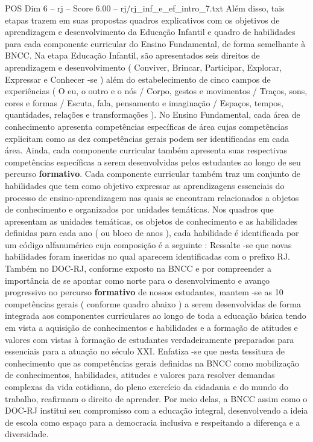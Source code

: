 \begin{textsample}{POS Dim 6 – rj – Score 6.00 – rj/rj\_inf\_e\_ef\_intro\_7.txt}
Além disso, tais etapas trazem em suas propostas quadros explicativos com os objetivos de aprendizagem e desenvolvimento da Educação Infantil e quadro de habilidades para cada componente curricular do Ensino Fundamental, de forma semelhante à BNCC.
Na etapa Educação Infantil, são apresentados seis direitos de aprendizagem e desenvolvimento ( Conviver, Brincar, Participar, Explorar, Expressar e Conhecer -se ) além do estabelecimento de cinco campos de experiências ( O eu, o outro e o nós / Corpo, gestos e movimentos / Traços, sons, cores e formas / Escuta, fala, pensamento e imaginação / Espaços, tempos, quantidades, relações e transformações ).
No Ensino Fundamental, cada área de conhecimento apresenta competências específicas de área cujas competências explicitam como as dez competências gerais podem ser identificadas em cada área.
Ainda, cada componente curricular também apresenta suas respectivas competências específicas a serem desenvolvidas pelos estudantes ao longo de seu percurso \textbf{formativo}.
Cada componente curricular também traz um conjunto de habilidades que tem como objetivo expressar as aprendizagens essenciais do processo de ensino-aprendizagem nas quais se encontram relacionados a objetos de conhecimento e organizados por unidades temáticas.
Nos quadros que apresentam as unidades temáticas, os objetos de conhecimento e as habilidades definidas para cada ano ( ou bloco de anos ), cada habilidade é identificada por um código alfanumérico cuja composição é a seguinte : Ressalte -se que novas habilidades foram inseridas no qual aparecem identificadas com o prefixo RJ.
Também no DOC-RJ, conforme exposto na BNCC e por compreender a importância de se apontar como norte para o desenvolvimento e avanço progressivo no percurso \textbf{formativo} de nossos estudantes, mantem -se as 10 competências gerais ( conforme quadro abaixo ) a serem desenvolvidas de forma integrada aos componentes curriculares ao longo de toda a educação básica tendo em vista a aquisição de conhecimentos e habilidades e a formação de atitudes e valores com vistas à formação de estudantes verdadeiramente preparados para essenciais para a atuação no século XXI.
Enfatiza -se que nesta tessitura de conhecimento que as competências gerais definidas na BNCC como mobilização de conhecimentos, habilidades, atitudes e valores para resolver demandas complexas da vida cotidiana, do pleno exercício da cidadania e do mundo do trabalho, reafirmam o direito de aprender.
Por meio delas, a BNCC assim como o DOC-RJ institui seu compromisso com a educação integral, desenvolvendo a ideia de escola como espaço para a democracia inclusiva e respeitando a diferença e a diversidade.

\end{textsample}

